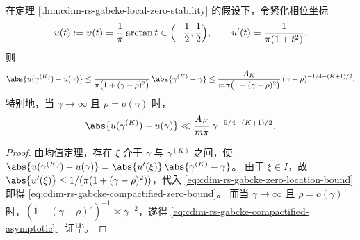 \begin{corollary}\label{cor:cdim-rs-gabcke-compactified-quadratic-gain}
在定理 \ref{thm:cdim-rs-gabcke-local-zero-stability} 的假设下，令紧化相位坐标
\[
u(t):=\upsilon(t)=\frac{1}{\pi}\arctan t\in\Bigl(-\frac12,\frac12\Bigr),
\qquad
u'(t)=\frac{1}{\pi(1+t^2)}.
\]
则
\begin{equation}\label{eq:cdim-rs-gabcke-compactified-zero-bound}
\abs{u(\gamma^{(K)})-u(\gamma)}
\le \frac{1}{\pi\bigl(1+(\gamma-\rho)^2\bigr)}\,\abs{\gamma^{(K)}-\gamma}
\le \frac{A_K}{m\pi\bigl(1+(\gamma-\rho)^2\bigr)}\,(\gamma-\rho)^{-1/4-(K+1)/2}.
\end{equation}
特别地，当 \(\gamma\to\infty\) 且 \(\rho=o(\gamma)\) 时，
\begin{equation}\label{eq:cdim-rs-gabcke-compactified-asymptotic}
\abs{u(\gamma^{(K)})-u(\gamma)}
\ll \frac{A_K}{m\pi}\,\gamma^{-9/4-(K+1)/2}.
\end{equation}
\end{corollary}
\begin{proof}
由均值定理，存在 \(\xi\) 介于 \(\gamma\) 与 \(\gamma^{(K)}\) 之间，使
\(
\abs{u(\gamma^{(K)})-u(\gamma)}=\abs{u'(\xi)}\,\abs{\gamma^{(K)}-\gamma}
\)。
由于 \(\xi\in I\)，故 \(\abs{u'(\xi)}\le 1/(\pi(1+(\gamma-\rho)^2))\)，代入 \eqref{eq:cdim-rs-gabcke-zero-location-bound} 即得 \eqref{eq:cdim-rs-gabcke-compactified-zero-bound}。
而当 \(\gamma\to\infty\) 且 \(\rho=o(\gamma)\) 时，\((1+(\gamma-\rho)^2)^{-1}\asymp \gamma^{-2}\)，遂得 \eqref{eq:cdim-rs-gabcke-compactified-asymptotic}。证毕。
\end{proof}

